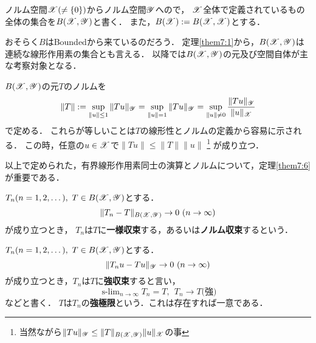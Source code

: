     \begin{Def}
        ノルム空間$\mathscr{X}(\neq \{0\})$からノルム空間$\mathscr{Y}$へので，
        $\mathscr{X}$全体で定義されているもの全体の集合を$B(\mathscr{X}, \mathscr{Y})$と書く．
        また，$B(\mathscr{X}):=B(\mathscr{X}, \mathscr{X})$とする．
    \end{Def}
    おそらく$B$はBoundedから来ているのだろう．
    定理\ref{them7:1}から，$B(\mathscr{X}, \mathscr{Y})$は連続な線形作用素の集合とも言える．
    以降では$B(\mathscr{X}, \mathscr{Y})$の元及び空間自体が主な考察対象となる．

    \begin{Def}
        $B(\mathscr{X}, \mathscr{Y})$の元$T$のノルムを
        \[
            \|T\|
            :=\sup_{\|u\| \leq 1}{\|Tu\|_{\mathscr{Y}}}
            =\sup_{\|u\|=1}{\|Tu\|_{\mathscr{Y}}}
            =\sup_{\|u\| \neq 0}{ \frac{\|Tu\|_{\mathscr{Y}}}{\|u\|_{\mathscr{X}}} }
        \]
        で定める．
        これらが等しいことは$T$の線形性とノルムの定義から容易に示される．
        この時，任意の$u \in \mathscr{X}$で$\|Tu\| \leq \|T\| \|u\|$
        \footnote{当然ながら$\|Tu\|_{\mathscr{Y}} \leq \|T\|_{B(\mathscr{X}, \mathscr{Y})} \|u\|_{\mathscr{X}} $の事}
        が成り立つ．
    \end{Def}
    以上で定められた，有界線形作用素同士の演算とノルムについて，定理\ref{them7:6}が重要である．

    \begin{Def}
        $T_n (n=1,2,\dots),~ T \in B(\mathscr{X}, \mathscr{Y})$とする．
        \[ \|T_n-T\|_{B(\mathscr{X}, \mathscr{Y})} \to 0 ~(n \to \infty) \]
        が成り立つとき，
        $T_n$は$T$に\textbf{一様収束}する，あるいは\textbf{ノルム収束}するという．
    \end{Def}
    \begin{Def}
        $T_n (n=1,2,\dots),~ T \in B(\mathscr{X}, \mathscr{Y})$とする．
        \[ \|T_n u-T u\|_{\mathscr{Y}} \to 0 ~(n \to \infty) \]
        が成り立つとき，$T_n$は$T$に\textbf{強収束}すると言い，
        \[ \operatorname{s-lim}_{n \to \infty}{T_n}=T,~~ T_n \to T \mbox{(強)} \]
        などと書く．
        $T$は$T_n$の\textbf{強極限}という．これは存在すれば一意である．
    \end{Def}


